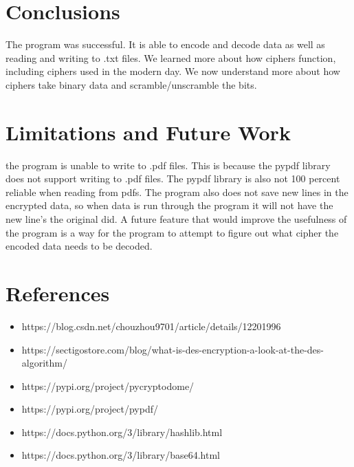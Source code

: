 \documentclass[12pt]{article}
\begin{document}
\section{Conclusions}
The program was successful. It is able to encode and decode data as well as reading and writing to .txt files. We learned more about how ciphers function, including ciphers used in the modern day. We now understand more about how ciphers take binary data and scramble/unscramble the bits.
\section{Limitations and Future Work}
the program is unable to write to .pdf files. This is because the pypdf library does not support writing to .pdf files. The pypdf library is also not 100 percent reliable when reading from pdfs. The program also does not save new lines in the encrypted data, so when data is run through the program it will not have the new line's the original did.
A future feature that would improve the usefulness of the program is a way for the program to attempt to figure out what cipher the encoded data needs to be decoded.
\section{References}
\begin{itemize}
    \item https://blog.csdn.net/chouzhou9701/article/details/12201996
    \item https://sectigostore.com/blog/what-is-des-encryption-a-look-at-the-des-algorithm/
    \item https://pypi.org/project/pycryptodome/
    \item https://pypi.org/project/pypdf/
    \item https://docs.python.org/3/library/hashlib.html
    \item https://docs.python.org/3/library/base64.html
\end{itemize}
\end{document}
